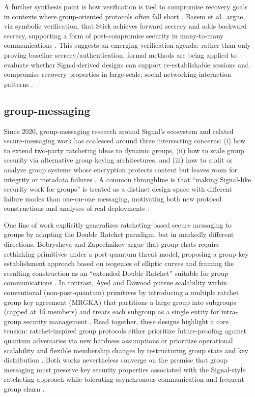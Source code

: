 A further synthesis point is how verification is tied to compromise recovery goals in contexts where group-oriented protocols often fall short \cite{basem2023}. Basem et al.\ argue, via symbolic verification, that Stick achieves forward secrecy and adds backward secrecy, supporting a form of post-compromise security in many-to-many communications \cite{basem2023}. This suggests an emerging verification agenda: rather than only proving baseline secrecy/authentication, formal methods are being applied to evaluate whether Signal-derived designs can support re-establishable sessions and compromise recovery properties in large-scale, social networking interaction patterns \cite{basem2023}.

\subsection{group-messaging}
Since 2020, group-messaging research around Signal’s ecosystem and related secure-messaging work has coalesced around three intersecting concerns: (i) how to extend two-party ratcheting ideas to dynamic groups, (ii) how to scale group security via alternative group keying architectures, and (iii) how to audit or analyze group systems whose encryption protects content but leaves room for integrity or metadata failures \cite{oppliger2024,ayed2025,sarvaiya2025,brigham2025,bobrysheva2021}. A common throughline is that “making Signal-like security work for groups” is treated as a distinct design space with different failure modes than one-on-one messaging, motivating both new protocol constructions and analyses of real deployments \cite{oppliger2024,ayed2025,brigham2025}.

One line of work explicitly generalizes ratcheting-based secure messaging to groups by adapting the Double Ratchet paradigm, but in markedly different directions. Bobrysheva and Zapechnikov argue that group chats require rethinking primitives under a post-quantum threat model, proposing a group key establishment approach based on isogenies of elliptic curves and framing the resulting construction as an “extended Double Ratchet” suitable for group communications \cite{bobrysheva2021}. In contrast, Ayed and Dawood pursue scalability within conventional (non-post-quantum) primitives by introducing a multiple ratchet group key agreement (MRGKA) that partitions a large group into subgroups (capped at 15 members) and treats each subgroup as a single entity for intra-group security management \cite{ayed2025}. Read together, these designs highlight a core tension: ratchet-inspired group protocols either prioritize future-proofing against quantum adversaries via new hardness assumptions \cite{bobrysheva2021} or prioritize operational scalability and flexible membership changes by restructuring group state and key distribution \cite{ayed2025}. Both works nevertheless converge on the premise that group messaging must preserve key security properties associated with the Signal-style ratcheting approach while tolerating asynchronous communication and frequent group churn \cite{bobrysheva2021,ayed2025}.

